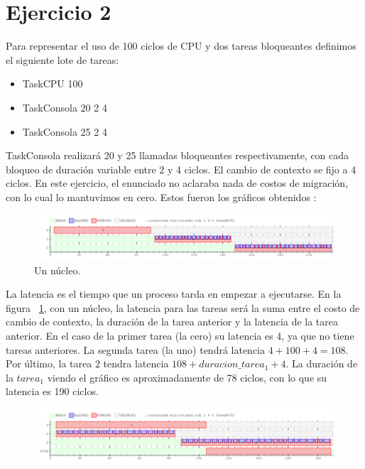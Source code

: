 \section{Ejercicio 2}

Para representar el uso de 100 ciclos de CPU y dos tareas bloqueantes definimos el siguiente lote de tareas:\\

\begin{itemize}
\item TaskCPU 100 
\item TaskConsola 20 2 4
\item TaskConsola 25 2 4
\end{itemize}
TaskConsola realizará 20 y 25 llamadas bloqueantes respectivamente, con cada bloqueo de duración variable entre 2 y 4 ciclos. El cambio de contexto se fijo a 4 ciclos. En este ejercicio, el enunciado no aclaraba nada de costos de migración, con lo cual lo mantuvimos en cero. Estos fueron los gráficos obtenidos :



\begin{figure}[h]
  \includegraphics[width=\textwidth]{../ej2/uncore.png}
  \caption{Un núcleo.}
  \label{fig:unnucleo}
\end{figure}

La latencia es el tiempo que un proceso tarda en empezar a ejecutarse. En la figura ~\ref{fig:unnucleo}, con un núcleo, la latencia para las tareas será la suma entre el costo de cambio de contexto, la duración de la tarea anterior y la latencia de la tarea anterior. En el caso de la primer tarea (la cero) su latencia es 4, ya que no tiene tareas anteriores. La segunda tarea (la uno) tendrá latencia $ 4 + 100 + 4 = 108$. Por último, la tarea 2 tendra latencia $ 108 + duracion\_tarea_{1} + 4$. La duración de la $tarea_{1}$ viendo el gráfico es aproximadamente de 78 ciclos, con lo que su latencia es 190 ciclos.




\begin{figure}[h]
  \includegraphics[width=\textwidth]{../ej2/doscores.png}
  \caption{}
  \label{fig:dosnucleos}
\end{figure}

